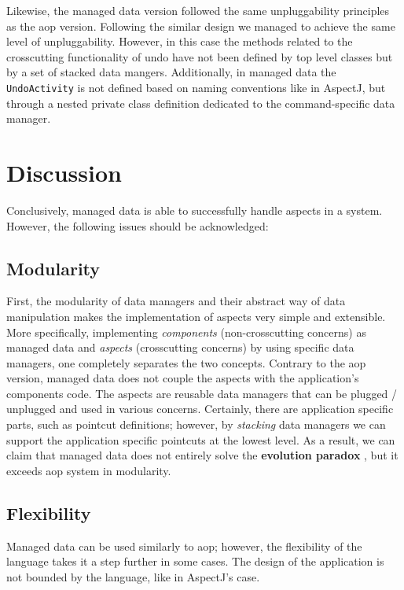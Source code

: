 Likewise, the managed data version followed the same unpluggability principles as the \ac{aop} version.
Following the similar design we managed to achieve the same level of unpluggability.
However, in this case the methods related to the crosscutting functionality of undo have not been defined by top level classes but by a set of stacked data mangers.
Additionally, in managed data the \texttt{UndoActivity} is not defined based on naming conventions like in AspectJ, but through a nested private class definition dedicated to the command-specific data manager.

\section{Discussion}\label{Evaluation Discussion}
Conclusively, managed data is able to successfully handle aspects in a system.
However, the following issues should be acknowledged:

\subsection{Modularity}
First, the modularity of data managers and their abstract way of data manipulation makes the implementation of aspects very simple and extensible.
More specifically, implementing \textit{components} (non-crosscutting concerns) as managed data and \textit{aspects} (crosscutting concerns) by using specific data managers, one completely separates the two concepts.
Contrary to the \ac{aop} version, managed data does not couple the aspects with the application's components code.
The aspects are reusable data managers that can be plugged / unplugged and used in various concerns.
Certainly, there are application specific parts, such as pointcut definitions; however, by \textit{stacking} data managers we can support the application specific pointcuts at the lowest level.
As a result, we can claim that managed data does not entirely solve the \textbf{evolution paradox} \cite{tourwe2003existence}, but it exceeds \ac{aop} system in modularity.

\subsection{Flexibility}
Managed data can be used similarly to \ac{aop}; however, the flexibility of the language takes it a step further in some cases.
The design of the application is not bounded by the language, like in AspectJ's case.

